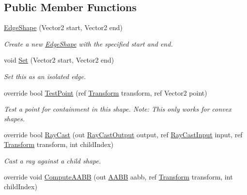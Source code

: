 \subsection*{Public Member Functions}
\begin{DoxyCompactItemize}
\item 
\hyperlink{class_farseer_physics_1_1_collision_1_1_shapes_1_1_edge_shape_af454ee16e459f1af806d48c9e752e833}{Edge\+Shape} (Vector2 start, Vector2 end)
\begin{DoxyCompactList}\small\item\em Create a new \hyperlink{class_farseer_physics_1_1_collision_1_1_shapes_1_1_edge_shape}{Edge\+Shape} with the specified start and end. \end{DoxyCompactList}\item 
void \hyperlink{class_farseer_physics_1_1_collision_1_1_shapes_1_1_edge_shape_ac736ef42d5dbd17d455fa1cecf145f60}{Set} (Vector2 start, Vector2 end)
\begin{DoxyCompactList}\small\item\em Set this as an isolated edge. \end{DoxyCompactList}\item 
override bool \hyperlink{class_farseer_physics_1_1_collision_1_1_shapes_1_1_edge_shape_abc465f07c1b808f1064603ca3450e317}{Test\+Point} (ref \hyperlink{struct_farseer_physics_1_1_common_1_1_transform}{Transform} transform, ref Vector2 point)
\begin{DoxyCompactList}\small\item\em Test a point for containment in this shape. Note\+: This only works for convex shapes. \end{DoxyCompactList}\item 
override bool \hyperlink{class_farseer_physics_1_1_collision_1_1_shapes_1_1_edge_shape_ae392323e8e4b3033d780a48fbb5c3a48}{Ray\+Cast} (out \hyperlink{struct_farseer_physics_1_1_collision_1_1_ray_cast_output}{Ray\+Cast\+Output} output, ref \hyperlink{struct_farseer_physics_1_1_collision_1_1_ray_cast_input}{Ray\+Cast\+Input} input, ref \hyperlink{struct_farseer_physics_1_1_common_1_1_transform}{Transform} transform, int child\+Index)
\begin{DoxyCompactList}\small\item\em Cast a ray against a child shape. \end{DoxyCompactList}\item 
override void \hyperlink{class_farseer_physics_1_1_collision_1_1_shapes_1_1_edge_shape_a98fe8356c92d07c68985ba2d9bf046d3}{Compute\+A\+A\+B\+B} (out \hyperlink{struct_farseer_physics_1_1_collision_1_1_a_a_b_b}{A\+A\+B\+B} aabb, ref \hyperlink{struct_farseer_physics_1_1_common_1_1_transform}{Transform} transform, int child\+Index)

\end{DoxyCompactItemize}
